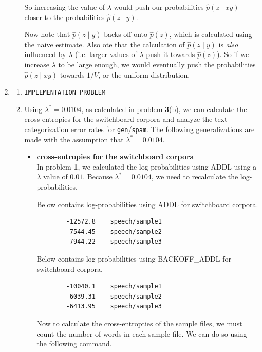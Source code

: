 \documentclass[11pt]{article}
\begin{document}
\begin{enumerate}
\begin{enumerate}[label=(\alph*)]
		So increasing the value of $\lambda$ would push our probabilities $\hat{p}(z \mid xy)$ closer to the probabilities $\hat{p}(z \mid y)$.

		Now note that $\hat{p}(z \mid y)$ backs off onto $\hat{p}(z)$, which is calculated using the naive estimate. Also ote that the calculation of $\hat{p}(z \mid y)$ is \textit{also} influenced by $\lambda$ (i.e. larger values of $\lambda$ push it towards $\hat{p}(z)$). So if we increase $\lambda$ to be large enough, we would eventually push the probabilities $\hat{p}(z \mid xy)$ towards $1/V$, or the uniform distribution.
	\end{enumerate}

\newpage
\item %
	\begin{enumerate}[label=(\alph*)]
	\item %
		\texttt{IMPLEMENTATION PROBLEM}
	\item %
		Using $\lambda^* = 0.0104$, as calculated in problem \textbf{3}(b), we can calculate the cross-entropies for the switchboard corpora and analyze the text categorization error rates for \texttt{gen}/\texttt{spam}. The following generalizations are made with the assumption that $\lambda^* = 0.0104$.
		\begin{itemize}
			\item[] \hspace{-24pt} 
				\textbf{cross-entropies for the switchboard corpora} \vspace{4pt} \\
				In problem \textbf{1}, we calculated the log-probabilities using ADDL using a $\lambda$ value of $0.01$. Because $\lambda^* = 0.0104$, we need to recalculate the log-probabilities. \vspace{4pt}

				Below contains log-probabilities using ADDL for switchboard corpora.
				\begin{lstlisting}
		-12572.8    speech/sample1
		-7544.45    speech/sample2
		-7944.22    speech/sample3
				\end{lstlisting}

				Below contains log-probabilities using BACKOFF\_ADDL for switchboard corpora.
				\begin{lstlisting}
		-10040.1    speech/sample1
		-6039.31    speech/sample2
		-6413.95    speech/sample3
				\end{lstlisting}
				
				Now to calculate the cross-entropties of the sample files, we must count the number of words in each sample file. We can do so using the following command. \vspace{4pt}


\end{itemize}
\end{enumerate}
\end{enumerate}
\end{document}
